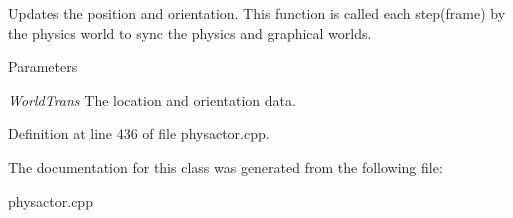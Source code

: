 Updates the position and orientation. This function is called each step(frame) by the physics world to sync the physics and graphical worlds. 
\begin{DoxyParams}{Parameters}
\item[{\em WorldTrans}]The location and orientation data. \end{DoxyParams}


Definition at line 436 of file physactor.cpp.

The documentation for this class was generated from the following file:\begin{DoxyCompactItemize}
\item 
physactor.cpp\end{DoxyCompactItemize}
